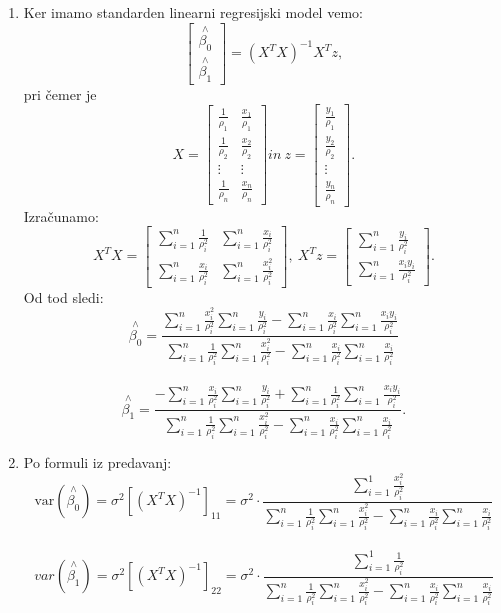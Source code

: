 \documentclass[12pt, letterpaper, twoside]{article}
\begin{document}
\begin{enumerate}
\begin{enumerate}
		\item Ker imamo standarden linearni regresijski model vemo: 
		 \[
		\begin{bmatrix}
		\overset{\wedge}{\beta_0}        \\
		\overset{\wedge}{\beta_1}      
		\end{bmatrix}
		= (X^T X)^{-1}X^Tz,\]
		pri čemer je 
		 \[ X =
		 \begin{bmatrix}
		 \frac{1}{\rho_1}       & \frac{x_1}{\rho_1}  \\
		 \frac{1}{\rho_2}       & \frac{x_2}{\rho_2}  \\
		 \vdots				   & \vdots \\
		 \frac{1}{\rho_n}       & \frac{x_n}{\rho_n}  
		 \end{bmatrix}
		 in ~ z =
		  \begin{bmatrix}
		  \frac{y_1}{\rho_1}        \\
		  \frac{y_2}{\rho_2}         \\
		  \vdots				   \\
		  \frac{y_n}{\rho_n}        
		  \end{bmatrix}
		  .\]
		  Izračunamo:
		  \[ X^TX =
		  \begin{bmatrix}
		  \sum_{i=1}^{n}\frac{1}{\rho_i^2}       & \sum_{i=1}^{n}\frac{x_i}{\rho_i^2}  \\
		  \sum_{i=1}^{n}\frac{x_i}{\rho_i^2}       & \sum_{i=1}^{n}\frac{x_i^2}{\rho_i^2} 
		  \end{bmatrix}
		  , ~ X^Tz =
		  \begin{bmatrix}
		  \sum_{i=1}^{n}\frac{y_i}{\rho_i^2}        \\
		  \sum_{i=1}^{n}\frac{x_iy_i}{\rho_i^2}       
		  \end{bmatrix}
		  .\]
		  Od tod sledi:
		 $$ \overset{\wedge}{\beta_0}= \frac{ \sum_{i=1}^{n}\frac{x_i^2}{\rho_i^2}\sum_{i=1}^{n}\frac{y_i}{\rho_i^2}-\sum_{i=1}^{n}\frac{x_i}{\rho_i^2}\sum_{i=1}^{n}\frac{x_iy_i}{\rho_i^2}}{\sum_{i=1}^{n}\frac{1}{\rho_i^2}\sum_{i=1}^{n}\frac{x_i^2}{\rho_i^2}-\sum_{i=1}^{n}\frac{x_i}{\rho_i^2}\sum_{i=1}^{n}\frac{x_i}{\rho_i^2}}  $$\\
		 $$ \overset{\wedge}{\beta_1}= \frac{-\sum_{i=1}^{n}\frac{x_i}{\rho_i^2}\sum_{i=1}^{n}\frac{y_i}{\rho_i^2}+\sum_{i=1}^{n}\frac{1}{\rho_i^2}\sum_{i=1}^{n}\frac{x_iy_i}{\rho_i^2}}{\sum_{i=1}^{n}\frac{1}{\rho_i^2}\sum_{i=1}^{n}\frac{x_i^2}{\rho_i^2}-\sum_{i=1}^{n}\frac{x_i}{\rho_i^2}\sum_{i=1}^{n}\frac{x_i}{\rho_i^2}}. $$
		\item Po formuli iz predavanj:
		$$\text{var}\left(\overset{\wedge}{\beta_0}\right) = \sigma^2 \left[\left(X^TX\right)^{-1}\right]_{11} =\sigma^2\cdot \frac{\sum_{i=1}^{1}\frac{x_i^2}{\rho_i^2}}{\sum_{i=1}^{n}\frac{1}{\rho_i^2}\sum_{i=1}^{n}\frac{x_i^2}{\rho_i^2}-\sum_{i=1}^{n}\frac{x_i}{\rho_i^2}\sum_{i=1}^{n}\frac{x_i}{\rho_i^2}}$$ \\
		$${var}\left(\overset{\wedge}{\beta_1}\right) =\sigma^2 \left[\left(X^TX\right)^{-1}\right]_{22}=\sigma^2\cdot \frac{\sum_{i=1}^{1}\frac{1}{\rho_i^2}}{\sum_{i=1}^{n}\frac{1}{\rho_i^2}\sum_{i=1}^{n}\frac{x_i^2}{\rho_i^2}-\sum_{i=1}^{n}\frac{x_i}{\rho_i^2}\sum_{i=1}^{n}\frac{x_i}{\rho_i^2}}$$
		

\end{enumerate}
\end{enumerate}
\end{document}
